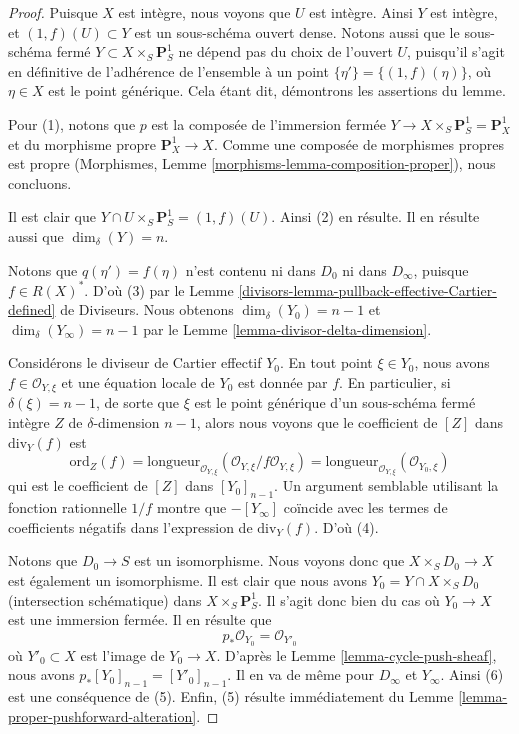 \begin{proof}
Puisque $X$ est intègre, nous voyons que $U$ est intègre.
Ainsi $Y$ est intègre, et $(1, f)(U) \subset Y$ est un sous-schéma ouvert dense.
Notons aussi que le sous-schéma fermé $Y \subset X \times_S \mathbf{P}^1_S$
ne dépend pas du choix de l'ouvert $U$, puisqu'il s'agit en définitive de
l'adhérence de l'ensemble à un point $\{\eta'\} = \{(1, f)(\eta)\}$,
où $\eta \in X$ est le point générique. Cela étant dit, démontrons les
assertions du lemme.

\medskip\noindent
Pour (1), notons que $p$ est la composée de l'immersion fermée
$Y \to X \times_S \mathbf{P}^1_S = \mathbf{P}^1_X$ et du morphisme propre
$\mathbf{P}^1_X \to X$. Comme une composée de morphismes propres
est propre (Morphismes, Lemme \ref{morphisms-lemma-composition-proper}),
nous concluons.

\medskip\noindent
Il est clair que $Y \cap U \times_S \mathbf{P}^1_S = (1, f)(U)$.
Ainsi (2) en résulte. Il en résulte aussi que $\dim_\delta(Y) = n$.

\medskip\noindent
Notons que $q(\eta') = f(\eta)$ n'est contenu ni dans $D_0$ ni dans $D_\infty$,
puisque $f \in R(X)^*$. D'où (3) par le
Lemme \ref{divisors-lemma-pullback-effective-Cartier-defined} de Diviseurs.
Nous obtenons $\dim_\delta(Y_0) = n - 1$
et $\dim_\delta(Y_\infty) = n - 1$ par le
Lemme \ref{lemma-divisor-delta-dimension}.

\medskip\noindent
Considérons le diviseur de Cartier effectif $Y_0$.
En tout point $\xi \in Y_0$, nous avons $f \in \mathcal{O}_{Y, \xi}$ et
une équation locale de $Y_0$ est donnée par $f$.
En particulier, si $\delta(\xi) = n - 1$, de sorte que $\xi$ est le point générique
d'un sous-schéma fermé intègre $Z$ de $\delta$-dimension $n - 1$,
alors nous voyons que le coefficient de $[Z]$ dans $\text{div}_Y(f)$ est
$$
\text{ord}_Z(f) =
\text{longueur}_{\mathcal{O}_{Y, \xi}}
(\mathcal{O}_{Y, \xi}/f\mathcal{O}_{Y, \xi}) =
\text{longueur}_{\mathcal{O}_{Y, \xi}}
(\mathcal{O}_{Y_0, \xi})
$$
qui est le coefficient de $[Z]$ dans $[Y_0]_{n - 1}$. Un argument semblable
utilisant la fonction rationnelle $1/f$ montre que
$-[Y_\infty]$ coïncide avec les termes de coefficients négatifs dans
l'expression de $\text{div}_Y(f)$. D'où (4).

\medskip\noindent
Notons que $D_0 \to S$ est un isomorphisme. Nous voyons donc que
$X \times_S D_0 \to X$ est également un isomorphisme. Il est clair que
nous avons $Y_0 = Y \cap X \times_S D_0$ (intersection schématique)
dans $X \times_S \mathbf{P}^1_S$. Il s'agit donc bien du cas où
$Y_0 \to X$ est une immersion fermée. Il en résulte que
$$
p_*\mathcal{O}_{Y_0} = \mathcal{O}_{Y'_0}
$$
où $Y'_0 \subset X$ est l'image de $Y_0 \to X$.
D'après le Lemme \ref{lemma-cycle-push-sheaf}, nous
avons $p_*[Y_0]_{n - 1} = [Y'_0]_{n - 1}$. Il en va de même
pour $D_\infty$ et $Y_\infty$. Ainsi (6) est une conséquence de (5).
Enfin, (5) résulte immédiatement du
Lemme \ref{lemma-proper-pushforward-alteration}.
\end{proof}

